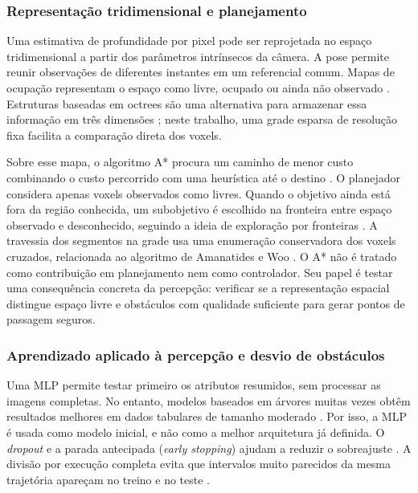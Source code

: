 \documentclass[article,a4paper,12pt,brazil,sumario=tradicional]{abntex2}
\begin{document}
\subsubsection{Representação tridimensional e planejamento}

Uma estimativa de profundidade por pixel pode ser reprojetada no espaço tridimensional a partir dos parâmetros intrínsecos da câmera. A pose permite reunir observações de diferentes instantes em um referencial comum. Mapas de ocupação representam o espaço como livre, ocupado ou ainda não observado \cite{Elfes1989}. Estruturas baseadas em octrees são uma alternativa para armazenar essa informação em três dimensões \cite{Hornung2013}; neste trabalho, uma grade esparsa de resolução fixa facilita a comparação direta dos voxels.

Sobre esse mapa, o algoritmo A* procura um caminho de menor custo combinando o custo percorrido com uma heurística até o destino \cite{Hart1968}. O planejador considera apenas voxels observados como livres. Quando o objetivo ainda está fora da região conhecida, um subobjetivo é escolhido na fronteira entre espaço observado e desconhecido, seguindo a ideia de exploração por fronteiras \cite{Yamauchi1997}. A travessia dos segmentos na grade usa uma enumeração conservadora dos voxels cruzados, relacionada ao algoritmo de Amanatides e Woo \cite{AmanatidesWoo1987}. O A* não é tratado como contribuição em planejamento nem como controlador. Seu papel é testar uma consequência concreta da percepção: verificar se a representação espacial distingue espaço livre e obstáculos com qualidade suficiente para gerar pontos de passagem seguros.

\subsubsection{Aprendizado aplicado à percepção e desvio de obstáculos}

Uma MLP permite testar primeiro os atributos resumidos, sem processar as imagens completas. No entanto, modelos baseados em árvores muitas vezes obtêm resultados melhores em dados tabulares de tamanho moderado \cite{OyallonandGaelVaroquaux5220}. Por isso, a MLP é usada como modelo inicial, e não como a melhor arquitetura já definida. O \textit{dropout} e a parada antecipada (\textit{early stopping}) ajudam a reduzir o sobreajuste \cite{Srivastava2014,Prechelt1998}. A divisão por execução completa evita que intervalos muito parecidos da mesma trajetória apareçam no treino e no teste \cite{Kapoor2023}.
\end{document}
